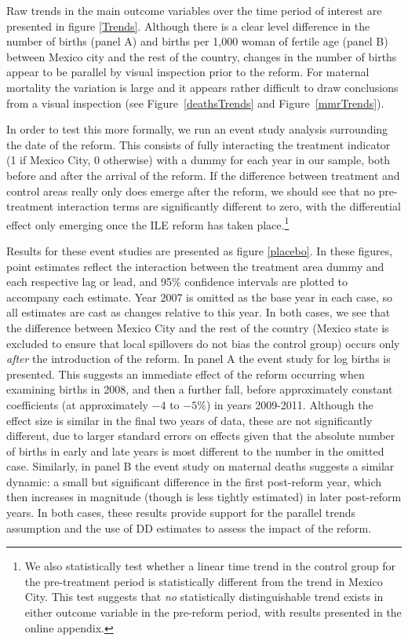 \documentclass[a4paper, 11pt]{article}
\begin{document}
\begin{spacing}{2}
Raw trends in the main outcome variables over the time period of interest are presented in figure \ref{Trends}. Although there is a clear level difference in the number of births (panel A) and births per 1,000 woman of fertile age (panel B) between Mexico city and the rest of the country, changes in the number of births appear to be parallel by visual inspection prior to the reform. For maternal mortality the variation is large and it appears rather difficult to draw conclusions from a visual inspection (see Figure~\ref{deathsTrends} and Figure~\ref{mmrTrends}).  

In order to test this more formally, we run an event study analysis surrounding the date of the reform.  This consists of fully interacting the treatment indicator (1 if Mexico City, 0 otherwise) with a dummy for each year in our sample, both before and after the arrival of the reform.  If the difference between treatment and control areas really only does emerge after the reform, we should see that no pre-treatment interaction terms are significantly different to zero, with the differential effect only emerging once the ILE reform has taken place.\footnote{We also statistically test whether a linear time trend in the control group for the pre-treatment period is statistically different from the trend in Mexico City. This test suggests that \emph{no} statistically distinguishable trend exists in either outcome variable in the pre-reform period, with results presented in the online appendix.}

Results for these event studies are presented as figure \ref{placebo}.  In these figures, point estimates reflect the interaction between the treatment area dummy and each respective lag or lead, and 95\% confidence intervals are plotted to accompany each estimate.  Year 2007 is omitted as the base year in each case, so all estimates are cast as changes relative to this year.  In both cases, we see that the difference between Mexico City and the rest of the country (Mexico state is excluded to ensure that local spillovers do not bias the control group) occurs only \emph{after} the introduction of the reform.  In panel A the event study for log births is presented.  This suggests an immediate effect of the reform occurring when examining births in 2008, and then a further fall, before approximately constant coefficients (at approximately $-4$ to $-5\%$) in years 2009-2011.  Although the effect size is similar in the final two years of data, these are not significantly different, due to larger standard errors on effects given that the absolute number of births in early and late years is most different to the number in the omitted case.  Similarly, in panel B the event study on maternal deaths suggests a similar dynamic: a small but significant difference in the first post-reform year, which then increases in magnitude (though is less tightly estimated) in later post-reform years.  In both cases, these results provide support for the parallel trends assumption and the use of DD estimates to assess the impact of the reform.


\end{spacing}
\end{document}
